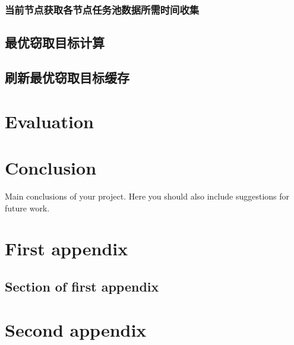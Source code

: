 \documentclass{mproj}
\begin{document}
\subsection{当前节点获取各节点任务池数据所需时间收集}


\section{最优窃取目标计算}

\section{刷新最优窃取目标缓存}


\chapter{Evaluation}


\chapter{Conclusion}\label{conclusion}

Main conclusions of your project. Here you should also include suggestions for future work.

\appendix %
\chapter{First appendix}

\section{Section of first appendix}

\chapter{Second appendix}



\end{document}
